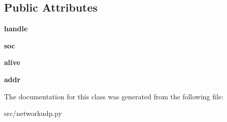 \subsection*{\-Public \-Attributes}
\begin{DoxyCompactItemize}
\item 
\hypertarget{classsrc_1_1networkudp_1_1_network_server_a7aebdf344b0392f532ff00483d556f21}{{\bfseries handle}}\label{classsrc_1_1networkudp_1_1_network_server_a7aebdf344b0392f532ff00483d556f21}

\item 
\hypertarget{classsrc_1_1networkudp_1_1_network_server_a99617b6eb70a2bc48fd90af30a40d177}{{\bfseries soc}}\label{classsrc_1_1networkudp_1_1_network_server_a99617b6eb70a2bc48fd90af30a40d177}

\item 
\hypertarget{classsrc_1_1networkudp_1_1_network_server_a1529d8df546f6a9d816368009fb79690}{{\bfseries alive}}\label{classsrc_1_1networkudp_1_1_network_server_a1529d8df546f6a9d816368009fb79690}

\item 
\hypertarget{classsrc_1_1networkudp_1_1_network_server_a034c43c4b6226da3cdec505b0957db57}{{\bfseries addr}}\label{classsrc_1_1networkudp_1_1_network_server_a034c43c4b6226da3cdec505b0957db57}

\end{DoxyCompactItemize}


\-The documentation for this class was generated from the following file\-:\begin{DoxyCompactItemize}
\item 
src/networkudp.\-py\end{DoxyCompactItemize}
